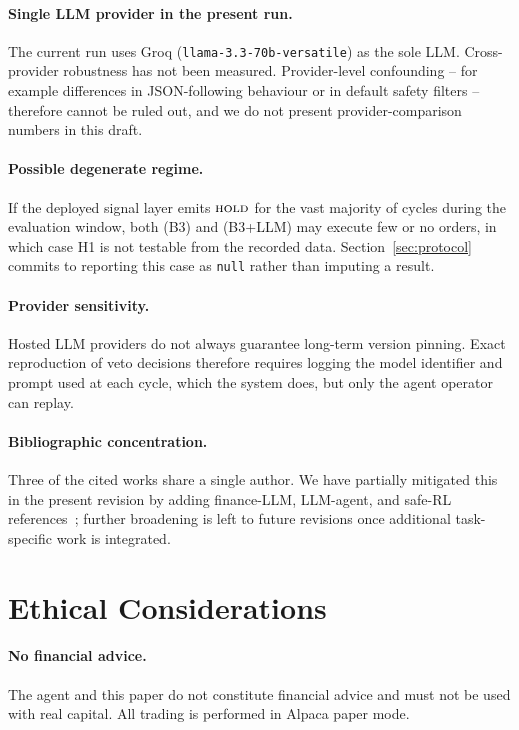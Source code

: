 \documentclass{article}
\begin{document}
\paragraph{Single LLM provider in the present run.} The current run uses Groq (\texttt{llama-3.3-70b-versatile}) as the sole LLM. Cross-provider robustness has not been measured. Provider-level confounding -- for example differences in JSON-following behaviour or in default safety filters -- therefore cannot be ruled out, and we do not present provider-comparison numbers in this draft.

\paragraph{Possible degenerate regime.} If the deployed signal layer emits $\textsc{hold}$ for the vast majority of cycles during the evaluation window, both (B3) and (B3+LLM) may execute few or no orders, in which case H1 is not testable from the recorded data. Section~\ref{sec:protocol} commits to reporting this case as \texttt{null} rather than imputing a result.

\paragraph{Provider sensitivity.} Hosted LLM providers do not always guarantee long-term version pinning. Exact reproduction of veto decisions therefore requires logging the model identifier and prompt used at each cycle, which the system does, but only the agent operator can replay.

\paragraph{Bibliographic concentration.} Three of the cited works share a single author. We have partially mitigated this in the present revision by adding finance-LLM, LLM-agent, and safe-RL references~\cite{bloomberggpt_wu2023,fingpt_yang2023,lopezlira_tang2023,react_yao2022,reflexion_shinn2023,shielded_rl_alshiekh2018}; further broadening is left to future revisions once additional task-specific work is integrated.

\section{Ethical Considerations}
\paragraph{No financial advice.} The agent and this paper do not constitute financial advice and must not be used with real capital. All trading is performed in Alpaca paper mode.
\end{document}
